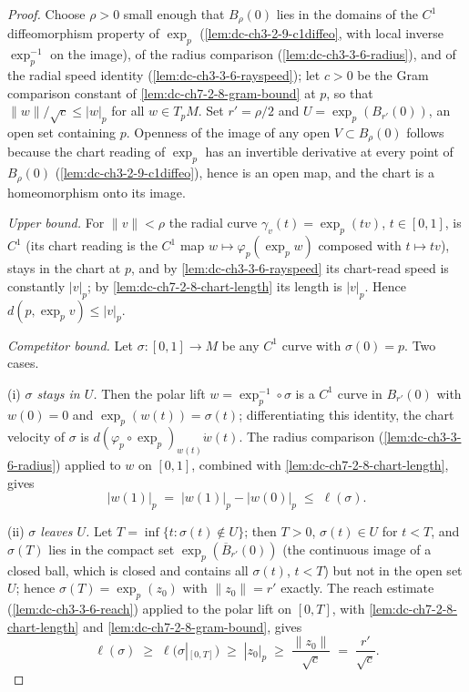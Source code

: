 \begin{proof}
  \leanok
  Choose $\rho>0$ small enough that $B_\rho(0)$ lies in the domains of
  the $C^1$ diffeomorphism property of $\exp_p$
  (\cref{lem:dc-ch3-2-9-c1diffeo}, with local inverse $\exp_p^{-1}$ on the
  image), of the radius comparison (\cref{lem:dc-ch3-3-6-radius}), and of the
  radial speed identity (\cref{lem:dc-ch3-3-6-rayspeed}); let $c>0$ be the
  Gram comparison constant of \cref{lem:dc-ch7-2-8-gram-bound} at $p$, so that
  $\|w\|/\sqrt c\le|w|_p$ for all $w\in T_pM$. Set $r'=\rho/2$ and
  $U=\exp_p(B_{r'}(0))$, an open set containing $p$. Openness of the image of
  any open $V\subset B_\rho(0)$ follows because the chart reading of $\exp_p$
  has an invertible derivative at every point of $B_\rho(0)$
  (\cref{lem:dc-ch3-2-9-c1diffeo}), hence is an open map, and the chart is a
  homeomorphism onto its image.

  \emph{Upper bound.} For $\|v\|<\rho$ the radial curve
  $\gamma_v(t)=\exp_p(tv)$, $t\in[0,1]$, is $C^1$ (its chart reading is the
  $C^1$ map $w\mapsto\varphi_p(\exp_p w)$ composed with $t\mapsto tv$), stays
  in the chart at $p$, and by \cref{lem:dc-ch3-3-6-rayspeed} its chart-read
  speed is constantly $|v|_p$; by \cref{lem:dc-ch7-2-8-chart-length} its
  length is $|v|_p$. Hence $d(p,\exp_p v)\le|v|_p$.

  \emph{Competitor bound.} Let $\sigma:[0,1]\to M$ be any $C^1$ curve with
  $\sigma(0)=p$. Two cases.

  (i) \emph{$\sigma$ stays in $U$.} Then the polar lift
  $w=\exp_p^{-1}\circ\sigma$ is a $C^1$ curve in
  $B_{r'}(0)$ with $w(0)=0$ and $\exp_p(w(t))=\sigma(t)$; differentiating this
  identity, the chart velocity of $\sigma$ is
  $d(\varphi_p\circ\exp_p)_{w(t)}\dot w(t)$.
  The radius comparison (\cref{lem:dc-ch3-3-6-radius}) applied to $w$ on
  $[0,1]$, combined with \cref{lem:dc-ch7-2-8-chart-length}, gives
  $$
  |w(1)|_p \;=\; |w(1)|_p-|w(0)|_p\;\le\;\ell(\sigma).
  $$

  (ii) \emph{$\sigma$ leaves $U$.} Let $T=\inf\{t:\sigma(t)\notin U\}$; then
  $T>0$, $\sigma(t)\in U$ for $t<T$, and $\sigma(T)$ lies in the compact set
  $\exp_p(\overline B_{r'}(0))$ (the continuous image of a closed ball, which
  is closed and contains all $\sigma(t)$, $t<T$) but not in the open set $U$;
  hence $\sigma(T)=\exp_p(z_0)$ with $\|z_0\|=r'$ exactly. The reach estimate
  (\cref{lem:dc-ch3-3-6-reach}) applied to the polar lift on $[0,T]$, with
  \cref{lem:dc-ch7-2-8-chart-length} and \cref{lem:dc-ch7-2-8-gram-bound},
  gives
  $$
  \ell(\sigma)\;\ge\;\ell\big(\sigma|_{[0,T]}\big)\;\ge\;|z_0|_p
  \;\ge\;\frac{\|z_0\|}{\sqrt c}\;=\;\frac{r'}{\sqrt c}.
  $$


\end{proof}
